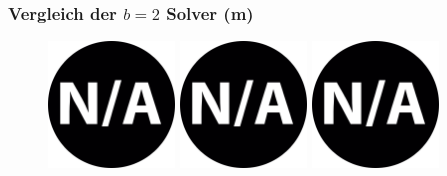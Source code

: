 \documentclass{beamer}
\begin{document}
\begin{frame}
\frametitle{Vergleich der $b = 2$ Solver (m)}

\begin{figure}
\centering
\includegraphics[width=0.3\textwidth]{images/na.png}
\includegraphics[width=0.3\textwidth]{images/na.png}
\includegraphics[width=0.3\textwidth]{images/na.png}
\caption*{\textsc{Zeitlimit 30min} $\quad\quad\quad$ \textsc{Zeitlimit 45min} $\quad\quad\quad$ \textsc{Zeitlimit 60min}}
\begin{subfigure}[b]{0.3\textwidth}
\centering
{}
\end{subfigure}

\end{figure}
\end{frame}
\end{document}
